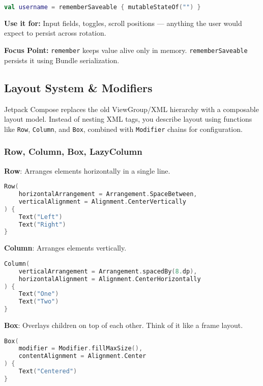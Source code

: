 \documentclass[a4paper,12pt]{article}
\begin{document}
\begin{lstlisting}[language=Kotlin]
val username = rememberSaveable { mutableStateOf("") }
\end{lstlisting}

\textbf{Use it for:} Input fields, toggles, scroll positions — anything the user would expect to persist across rotation.

\textbf{Focus Point:} \texttt{remember} keeps value alive only in memory. \texttt{rememberSaveable} persists it using Bundle serialization.


\subsection{Layout System \& Modifiers}
\label{sec:compose_layout}

Jetpack Compose replaces the old ViewGroup/XML hierarchy with a composable layout model. Instead of nesting XML tags, you describe layout using functions like \texttt{Row}, \texttt{Column}, and \texttt{Box}, combined with \texttt{Modifier} chains for configuration.

\subsubsection{Row, Column, Box, LazyColumn}

\textbf{Row}: Arranges elements horizontally in a single line.

\begin{lstlisting}[language=Kotlin]
Row(
    horizontalArrangement = Arrangement.SpaceBetween,
    verticalAlignment = Alignment.CenterVertically
) {
    Text("Left")
    Text("Right")
}
\end{lstlisting}

\textbf{Column}: Arranges elements vertically.

\begin{lstlisting}[language=Kotlin]
Column(
    verticalArrangement = Arrangement.spacedBy(8.dp),
    horizontalAlignment = Alignment.CenterHorizontally
) {
    Text("One")
    Text("Two")
}
\end{lstlisting}

\textbf{Box}: Overlays children on top of each other. Think of it like a frame layout.

\begin{lstlisting}[language=Kotlin]
Box(
    modifier = Modifier.fillMaxSize(),
    contentAlignment = Alignment.Center
) {
    Text("Centered")
}
\end{lstlisting}
\end{document}
